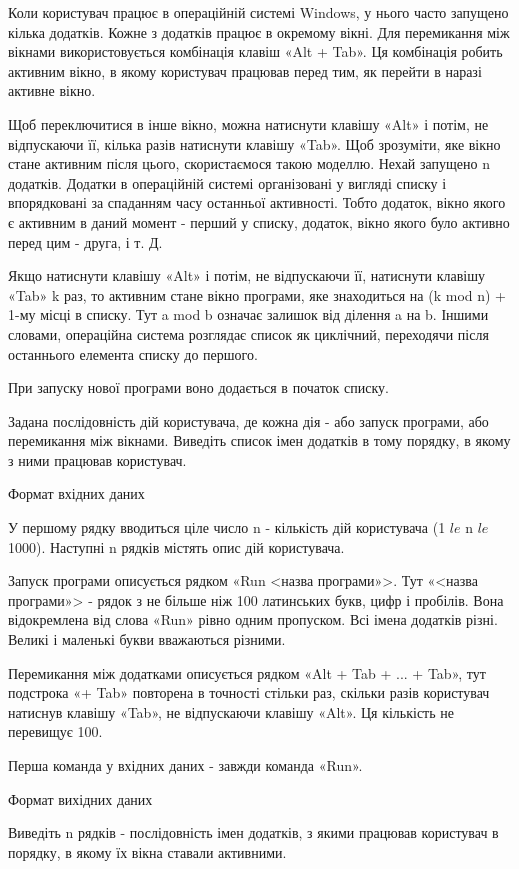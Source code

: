 \documentclass[]{article}
\begin{document}
Коли користувач працює в операційній системі Windows, у нього часто запущено кілька додатків. Кожне з додатків працює в окремому вікні. Для перемикання між вікнами використовується комбінація клавіш «Alt + Tab». Ця комбінація робить активним вікно, в якому користувач працював перед тим, як перейти в наразі активне вікно.

Щоб переключитися в інше вікно, можна натиснути клавішу «Alt» і потім, не відпускаючи її, кілька разів натиснути клавішу «Tab». Щоб зрозуміти, яке вікно стане активним після цього, скористаємося такою моделлю. Нехай запущено n додатків. Додатки в операційній системі організовані у вигляді списку і впорядковані за спаданням часу останньої активності. Тобто додаток, вікно якого є активним в даний момент - перший у списку, додаток, вікно якого було активно перед цим - друга, і т. Д.

Якщо натиснути клавішу «Alt» і потім, не відпускаючи її, натиснути клавішу «Tab» k раз, то активним стане вікно програми, яке знаходиться на (k mod n) + 1-му місці в списку. Тут a mod b означає залишок від ділення a на b. Іншими словами, операційна система розглядає список як циклічний, переходячи після останнього елемента списку до першого.

При запуску нової програми воно додається в початок списку.

Задана послідовність дій користувача, де кожна дія - або запуск програми, або перемикання між вікнами. Виведіть список імен додатків в тому порядку, в якому з ними працював користувач.

Формат вхідних даних

У першому рядку вводиться ціле число n - кількість дій користувача (1 $ le $ n $ le $ 1000). Наступні n рядків містять опис дій користувача.

Запуск програми описується рядком «Run <назва програми»>. Тут «<назва програми»> - рядок з не більше ніж 100 латинських букв, цифр і пробілів. Вона відокремлена від слова «Run» рівно одним пропуском. Всі імена додатків різні. Великі і маленькі букви вважаються різними.

Перемикання між додатками описується рядком «Alt + Tab + ... + Tab», тут подстрока «+ Tab» повторена в точності стільки раз, скільки разів користувач натиснув клавішу «Tab», не відпускаючи клавішу «Alt». Ця кількість не перевищує 100.

Перша команда у вхідних даних - завжди команда «Run».

Формат вихідних даних

Виведіть n рядків - послідовність імен додатків, з якими працював користувач в порядку, в якому їх вікна ставали активними.
\end{document}
